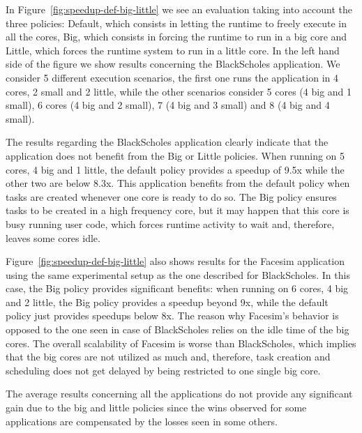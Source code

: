 In Figure~\ref{fig:speedup-def-big-little} we see an evaluation taking into account the three policies: Default, which consists in letting the runtime to freely execute in all the cores, Big, which consists in forcing the runtime to run in a big core and Little, which
forces the runtime system to run in a little core.                                                                                                                                                                                    
In the left hand side of the figure we show results concerning the BlackScholes application. We consider 5 different execution scenarios, the first one runs the application in 4 cores, 2 small and 2 little, while the other scenarios consider 5 cores (4 big and 1 small), 6 cores (4 big and 2 small), 7 (4 big and 3 small) and 8 (4 big and 4 small).                                                        
                                                                      
The results regarding the BlackScholes application clearly indicate that the application does not benefit from the Big or Little policies.                                                                                                   
When running on 5 cores, 4 big and 1 little, the default policy provides a speedup of 9.5x while the other two are below 8.3x.                                                                                                               
This application benefits from the default policy when tasks are created whenever one core is ready to do so.                                                                                                                                
The Big policy ensures tasks to be created in a high frequency core, but it may happen that this core is busy running user code, which forces runtime activity to wait and, therefore, leaves some cores idle.                               
                                                                                                                                                                                                                                             
Figure~\ref{fig:speedup-def-big-little} also shows results for the Facesim application using the same experimental setup as the one described for BlackScholes. 
In this case, the Big policy provides significant benefits: when running on 6 cores, 4 big and 2 little, the Big policy provides a speedup beyond 9x, while the default policy just provides speedups below 8x.                              
The reason why Facesim's behavior is opposed to the one seen in case of BlackScholes relies on the idle time of the big cores.                                                                                                              
The overall scalability of Facesim is worse than BlackScholes, which implies that the big cores are not utilized as much and, therefore, task creation and scheduling does not get delayed by being restricted to one single big core.     

The average results concerning all the applications do not provide any significant gain due to the big and little policies since the wins observed for some applications are compensated by the losses seen in some others.
\fi